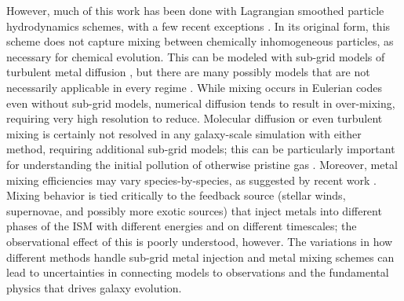 \documentclass[twocolumn]{aastex61}
\begin{document}


However, much of this work has been done with Lagrangian smoothed particle hydrodynamics schemes, with a few recent exceptions  \citep{Few2012,Simpson2013,Few2014,Vorobyov2015,Corlies2018}. In its original form, this scheme does not capture mixing between chemically inhomogeneous particles, as necessary for chemical evolution. This can be modeled with sub-grid models of turbulent metal diffusion \citep[e.g.][]{Shen2010,Shen2013,Brook2014,Su2017a,Escala2018}, but there are many possibly models that are not necessarily applicable in every regime \citep[see ][]{Revaz2016}. While mixing occurs in Eulerian codes even without sub-grid models, numerical diffusion tends to result in over-mixing, requiring very high resolution to reduce. Molecular diffusion or even turbulent mixing is certainly not resolved in any galaxy-scale simulation with either method, requiring additional sub-grid models; this can be particularly important for understanding the initial pollution of otherwise pristine gas \citep[see ][ and references therein]{PanScannapiecoScalo2013,Sarmento2017}. Moreover, metal mixing efficiencies may vary species-by-species, as suggested by recent work \citep[e.g.][]{Cohen2013, Roederer2014, FrebelNorris2015, Hirai2017, Cote2017}. Mixing behavior is tied critically to the feedback source (stellar winds, supernovae, and possibly more exotic sources) that inject metals into different phases of 
the ISM with different energies and on different timescales; the observational effect of this is poorly understood, however. The variations in how different methods handle sub-grid metal injection and metal mixing schemes can lead to uncertainties in connecting models to observations and the fundamental physics that drives galaxy evolution.
\end{document}
